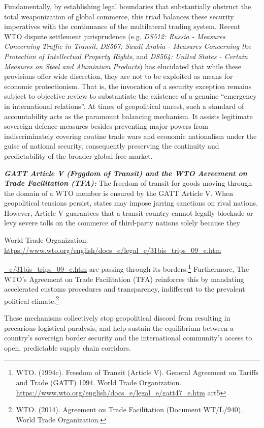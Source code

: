 Fundamentally, by establishing legal boundaries that substantially obstruct the total weaponization of global commerce, this triad balances these security imperatives with the continuance of the multilateral trading system. Recent WTO dispute settlement jurisprudence (e.g. \emph{DS512: Russia - Measures Concerning Traffic in Transit}, \emph{DS567: Saudi Arabia - Measures Concerning the Protection of Intellectual Property Rights}, and \emph{DS564: United States - Certain Measures on Steel and Aluminium Products}) has elucidated that while these provisions offer wide discretion, they are not to be exploited as means for economic protectionism. That is, the invocation of a security exception remains subject to objective review to substantiate the existence of a genuine “emergency in international relations”. At times of geopolitical unrest, such a standard of accountability acts as the paramount balancing mechanism. It assists legitimate sovereign defence measures besides preventing major powers from indiscriminately covering routine trade wars and economic nationalism under the guise of national security, consequently preserving the continuity and predictability of the broader global free market.

\emph{\textbf{GATT Article V (Frggdom of Transit) and the WTO Aereement on Trade Facilitation (TFA):}} The freedom of transit for goods moving through the domain of a WTO member is ensured by the GATT Article V. When geopolitical tensions persist, states may impose jarring sanctions on rival nations. However, Article V guarantees that a transit country cannot legally blockade or levy severe tolls on the commerce of third-party nations solely because they

World Trade Organization. \url{https://www.wto.org/english/docs_e/legal_e/31bis_trips_09_e.htm}

\href{https://www.wto.org/english/docs_e/legal_e/31bis_trips_09_e.htm}{\_e/31bis\_trips\_09\_e.htm} are passing through its borders.\footnote{WTO. (1994c). Freedom of Transit (Article V). General Agreement on Tariffs and Trade (GATT) 1994. World Trade Organization. \url{https://www.wto.org/english/docs_e/legal_e/gatt47_e.htm} art5} Furthermore, The WTO’s Agreement on Trade Facilitation (TFA) reinforces this by mandating accelerated customs procedures and transparency, indifferent to the prevalent political climate.\footnote{WTO. (2014). Agreement on Trade Facilitation (Document WT/L/940). World Trade Organization.}

These mechanisms collectively stop geopolitical discord from resulting in precarious logistical paralysis, and help sustain the equilibrium between a country’s sovereign border security and the international community’s access to open, predictable supply chain corridors.

